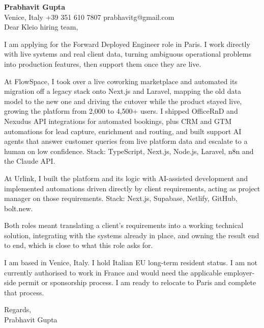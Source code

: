 \documentclass[a4paper,10.5pt]{article}
\begin{document}
\textbf{Prabhavit Gupta}\\
Venice, Italy \textbar{} +39 351 610 7807 \textbar{} prabhavitg@gmail.com\\[10pt]
Dear Kleio hiring team,

I am applying for the Forward Deployed Engineer role in Paris. I work directly with live systems and real client data, turning ambiguous operational problems into production features, then support them once they are live.

At FlowSpace, I took over a live coworking marketplace and automated its migration off a legacy stack onto Next.js and Laravel, mapping the old data model to the new one and driving the cutover while the product stayed live, growing the platform from 2,000 to 4,500+ users. I shipped OfficeRnD and Nexudus API integrations for automated bookings, plus CRM and GTM automations for lead capture, enrichment and routing, and built support AI agents that answer customer queries from live platform data and escalate to a human on low confidence. Stack: TypeScript, Next.js, Node.js, Laravel, n8n and the Claude API.

At Urlink, I built the platform and its logic with AI-assisted development and implemented automations driven directly by client requirements, acting as project manager on those requirements. Stack: Next.js, Supabase, Netlify, GitHub, bolt.new.

Both roles meant translating a client's requirements into a working technical solution, integrating with the systems already in place, and owning the result end to end, which is close to what this role asks for.

I am based in Venice, Italy. I hold Italian EU long-term resident status. I am not currently authorised to work in France and would need the applicable employer-side permit or sponsorship process. I am ready to relocate to Paris and complete that process.

Regards,\\
Prabhavit Gupta
\end{document}
